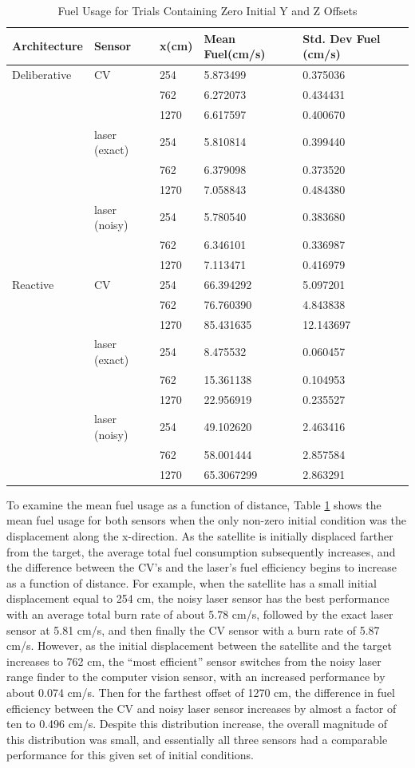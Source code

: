 \documentclass[journal, 10pt]{IEEEtran}
\begin{document}
\begin{table}
\centering
\normalsize
\caption{Fuel Usage for Trials Containing Zero Initial Y and Z Offsets}
\begin{tabular}{lllll}
\toprule
Architecture & Sensor & x(cm) & Mean Fuel(cm/s) & Std. Dev Fuel (cm/s)\\
\midrule
Deliberative & CV & 254  & 5.873499 & 0.375036\\
& & 762 &  6.272073 & 0.434431\\
& & 1270  &  6.617597 &0.400670\\
			& laser (exact) & 254  &    5.810814 &0.399440\\
			& & 762  &    6.379098 &0.373520\\
			& & 1270  & 7.058843 & 0.484380\\
			& laser (noisy) & 254 &    5.780540 &0.383680\\
			& & 762 &    6.346101 &0.336987\\
			& & 1270 & 7.113471 &0.416979\\
\cmidrule(lr) {1-5}
Reactive & CV & 254  &   66.394292 &5.097201\\
& & 762  &   76.760390 & 4.843838\\
& & 1270 & 85.431635 &12.143697\\
& laser (exact) & 254  &   8.475532 & 0.060457\\
& & 762  &  15.361138 &0.104953\\
& & 1270  & 22.956919 & 0.235527\\
& laser (noisy) & 254 &  49.102620 & 2.463416\\
& & 762  &  58.001444 &2.857584\\
& & 1270 & 65.3067299 &2.863291\\
\bottomrule
\end{tabular}
\label{initial}
\end{table}

To examine the mean fuel usage as a function of distance, Table \ref{initial} shows the mean fuel usage for both sensors when the only non-zero initial condition was the displacement along the x-direction. As the satellite is initially displaced farther from the target, the average total fuel consumption subsequently increases, and the difference between the CV's and the laser's fuel efficiency begins to increase as a function of distance. For example, when the satellite has a small initial displacement equal to 254 cm, the noisy laser sensor has the best performance with an average total burn rate of about 5.78 cm/s, followed by the exact laser sensor at 5.81 cm/s, and then finally the CV sensor with a burn rate of 5.87 cm/s. However, as the initial displacement between the satellite and the target increases to 762 cm, the ``most efficient'' sensor switches from the noisy laser range finder to the computer vision sensor, with an increased performance by about 0.074 cm/s. Then for the farthest offset of 1270 cm, the difference in fuel efficiency between the CV and noisy laser sensor increases by almost a factor of ten to 0.496 cm/s. Despite this distribution increase, the overall magnitude of this distribution was small, and essentially all three sensors had a comparable performance for this given set of initial conditions. 
\end{document}
